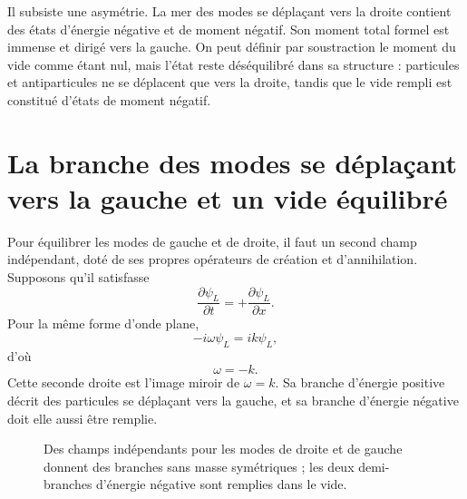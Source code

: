 Il subsiste une asymétrie. La mer des modes se déplaçant vers la droite contient des états d’énergie négative et de moment négatif. Son moment total formel est immense et dirigé vers la gauche. On peut définir par soustraction le moment du vide comme étant nul, mais l’état reste déséquilibré dans sa structure : particules et antiparticules ne se déplacent que vers la droite, tandis que le vide rempli est constitué d’états de moment négatif.

\section{La branche des modes se déplaçant vers la gauche et un vide équilibré}

Pour équilibrer les modes de gauche et de droite, il faut un second champ indépendant, doté de ses propres opérateurs de création et d’annihilation. Supposons qu’il satisfasse
\begin{equation}
\frac{\partial\psi_L}{\partial t}
=
+\frac{\partial\psi_L}{\partial x}.
\end{equation}
Pour la même forme d’onde plane,
\begin{equation}
-i\omega\psi_L=ik\psi_L,
\end{equation}
d’où
\begin{equation}
\omega=-k.
\end{equation}
Cette seconde droite est l’image miroir de \(\omega=k\). Sa branche d’énergie positive décrit des particules se déplaçant vers la gauche, et sa branche d’énergie négative doit elle aussi être remplie.

\begin{figure}[htbp]
\centering
{}
\caption{Des champs indépendants pour les modes de droite et de gauche donnent des branches sans masse symétriques ; les deux demi-branches d’énergie négative sont remplies dans le vide.}
\end{figure}

